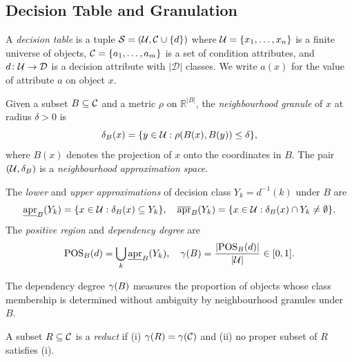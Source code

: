 \subsection{Decision Table and Granulation}
\label{sec:notation}

A \emph{decision table} is a tuple $\mathcal{S} = (\mathcal{U}, \mathcal{C} \cup \{d\})$ where
$\mathcal{U} = \{x_1,\ldots,x_n\}$ is a finite universe of objects,
$\mathcal{C} = \{a_1,\ldots,a_m\}$ is a set of condition attributes,
and $d\colon\mathcal{U} \to \mathcal{D}$ is a decision attribute with $|\mathcal{D}|$
classes.  We write $a(x)$ for the value of attribute $a$ on object $x$.

\begin{definition}
\label{def:nb}
Given a subset $B \subseteq \mathcal{C}$ and a metric $\rho$ on $\mathbb{R}^{|B|}$,
the \emph{neighbourhood granule} of $x$ at radius $\delta>0$ is
\begin{equation}\label{eq:nb}
  \delta_{B}(x) = \{y \in \mathcal{U} : \rho(B(x), B(y)) \leq \delta\},
\end{equation}
where $B(x)$ denotes the projection of $x$ onto the coordinates in $B$.
The pair $(\mathcal{U}, \delta_{B})$ is a \emph{neighbourhood approximation space}.
\end{definition}

\begin{definition}
\label{def:dep}
The \emph{lower} and \emph{upper approximations} of decision class
$Y_k = d^{-1}(k)$ under $B$ are
\begin{equation}\label{eq:approx}
  \underline{\mathrm{apr}}_B(Y_k) = \{x \in \mathcal{U} : \delta_{B}(x) \subseteq Y_k\}, \quad
  \overline{\mathrm{apr}}_B(Y_k) = \{x \in \mathcal{U} : \delta_{B}(x) \cap Y_k \neq \emptyset\}.
\end{equation}
The \emph{positive region} and \emph{dependency degree} are
\begin{equation}\label{eq:dep}
  \mathrm{POS}_B(d) = \bigcup_{k} \underline{\mathrm{apr}}_B(Y_k), \quad
  \gamma(B) = \frac{|\mathrm{POS}_B(d)|}{|\mathcal{U}|} \in [0,1].
\end{equation}
\end{definition}

The dependency degree $\gamma(B)$ measures the proportion of objects whose
class membership is determined without ambiguity by neighbourhood granules
under $B$.

\begin{definition}[Reduct]
A subset $R \subseteq \mathcal{C}$ is a \emph{reduct} if (i) $\gamma(R) = \gamma(\mathcal{C})$
and (ii) no proper subset of $R$ satisfies (i).
\end{definition}

